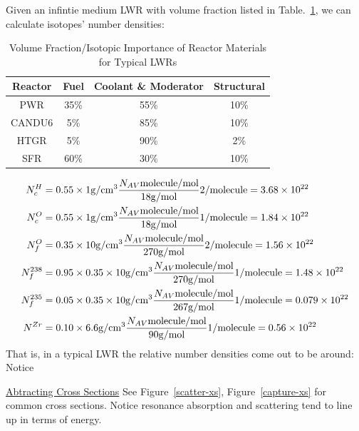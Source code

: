 \documentclass{school-22.211-notes}
\begin{document}
\clearpage
Given an infintie medium LWR with volume fraction listed in Table.~\ref{volume-fraction}, we can calculate isotopes' number densities: 

\begin{table}[ht]
  \centering
  \begin{tabular}{|c|c|c|c|} \hline
    Reactor & Fuel & Coolant \& Moderator & Structural  \\ \hline \hline
    PWR & 35\% & 55\% & 10\% \\ \hline
    CANDU6 & 5\% & 85\% & 10\%  \\ \hline
    HTGR & 5\% & 90\% & 2\% \\ \hline
    SFR & 60\% & 30\% & 10\% \\ \hline
  \end{tabular}
  \caption{Volume Fraction/Isotopic Importance of Reactor Materials for Typical LWRs} \label{volume-fraction}
\end{table}

\begin{align}
N^H_c &= 0.55 \times 1 \mathrm{g}/\mathrm{cm}^3 \frac{N_{AV} \mathrm{molecule}/\mathrm{mol}}{18 \mathrm{g}/\mathrm{mol}} 2/\mathrm{molecule}  = 3.68 \times 10^{22} \\
N^O_c &= 0.55 \times 1 \mathrm{g}/\mathrm{cm}^3 \frac{N_{AV} \mathrm{molecule}/\mathrm{mol}}{18 \mathrm{g}/\mathrm{mol}} 1/\mathrm{molecule}  = 1.84 \times 10^{22} \\
N^O_f &= 0.35 \times 10 \mathrm{g}/\mathrm{cm}^3 \frac{N_{AV} \mathrm{molecule}/\mathrm{mol}}{270 \mathrm{g}/\mathrm{mol}} 2/\mathrm{molecule}  = 1.56 \times 10^{22} \\
N^{238}_f &= 0.95 \times 0.35 \times 10 \mathrm{g}/\mathrm{cm}^3 \frac{N_{AV} \mathrm{molecule}/\mathrm{mol}}{270 \mathrm{g}/\mathrm{mol}} 1/\mathrm{molecule}  = 1.48 \times 10^{22} \\
N^{235}_f &= 0.05 \times 0.35 \times 10 \mathrm{g}/\mathrm{cm}^3 \frac{N_{AV} \mathrm{molecule}/\mathrm{mol}}{267 \mathrm{g}/\mathrm{mol}} 1/\mathrm{molecule}  = 0.079 \times 10^{22} \\
N^{Zr} &= 0.10 \times 6.6 \mathrm{g}/\mathrm{cm}^3 \frac{N_{AV} \mathrm{molecule}/\mathrm{mol}}{90 \mathrm{g}/\mathrm{mol}} 1/\mathrm{molecule}  = 0.56 \times 10^{22} 
\end{align}
That is, in a typical LWR the relative number densities come out to be around: 
Notice  


\uline{Abtracting Cross Sections}
See Figure~\ref{scatter-xs}, Figure~\ref{capture-xs} for common cross sections. Notice resonance absorption and scattering tend to line up in terms of energy. 
\end{document}

